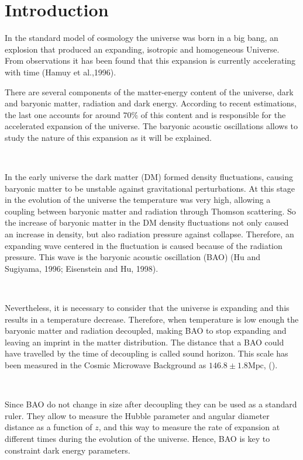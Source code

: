 \chapter{Introduction}\label{intro}


In the standard model of cosmology the universe was born in a big bang, an explosion that produced an
expanding, isotropic and homogeneous Universe. From observations it has been found that this expansion  
is currently accelerating with time (Hamuy et al.,1996). 

There are several components of the matter-energy content of the universe, 
dark and baryonic matter, radiation and dark energy. According to recent estimations, the last one accounts for 
around $70\%$ of this content and is responsible for the accelerated expansion of the universe. 
The baryonic acoustic oscillations allows to study the nature of this expansion as it will be explained.

\

In the early universe the dark matter (DM) formed density fluctuations, causing baryonic matter to be unstable against
gravitational perturbations. At this stage in the evolution of the universe the temperature was very high, allowing a coupling between
baryonic matter and radiation through Thomson scattering. 
So the increase of baryonic matter in the DM density fluctuations not only caused an increase 
in density, but also radiation pressure against collapse. Therefore, an expanding wave centered in the fluctuation
is caused because of the radiation pressure. This wave is the baryonic acoustic oscillation (BAO) (Hu and Sugiyama, 1996;
Eisenstein and Hu, 1998). 

\	

Nevertheless, it is necessary to consider that the universe is expanding and this results in a  
temperature decrease. Therefore, when temperature is low enough the baryonic matter and radiation 
decoupled, making BAO to stop expanding and leaving an imprint in the matter distribution. 
The distance that a BAO could have travelled by the time of
decoupling is called sound horizon. This scale has been measured in the Cosmic Microwave Background 
as $146.8\pm 1.8 \mathrm{Mpc}$, (\cite{SIZE}).  

\

Since BAO do not change in size after decoupling they can be used as a standard ruler.  They allow to
measure the Hubble parameter and angular diameter distance as a function of $z$, and this way to measure the rate 
of expansion at different times during the evolution of the universe. Hence, BAO is key to constraint dark energy 
parameters. 

